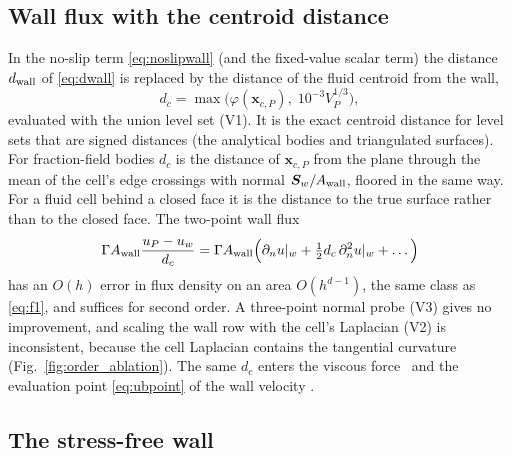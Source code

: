 \documentclass[11pt,a4paper]{article}
\theoremstyle{remark}
\newcommand{\xx}{\bm{x}}
\newcommand{\Aw}{A_{\rm wall}}
\newcommand{\dw}{d_{\rm wall}}
\begin{document}
\subsection{Wall flux with the centroid distance}

In the no-slip term \eqref{eq:noslipwall} (and the fixed-value scalar term) the distance
$\dw$ of \eqref{eq:dwall} is replaced by the distance of the fluid centroid from the wall,
\begin{equation}
d_c=\max\big(\varphi(\xx_{c,P}),\;10^{-3}V_P^{1/3}\big),
\label{eq:dc}
\end{equation}
evaluated with the union level set (V1). It is the exact centroid distance for level sets that
are signed distances (the analytical bodies and triangulated surfaces). For fraction-field
bodies $d_c$ is the distance of $\xx_{c,P}$ from the plane through the mean of the cell's edge
crossings with normal $\bm S_w/\Aw$, floored in the same way. For a fluid cell behind a closed face it is the distance to the true
surface rather than to the closed face. The two-point wall flux
\begin{equation}
\Gamma\Aw\frac{u_P-u_w}{d_c}=\Gamma\Aw\Big(\partial_nu|_w+\tfrac12d_c\,\partial^2_nu|_w+\dots\Big)
\end{equation}
has an $O(h)$ error in flux density on an area $O(h^{d-1})$, the same class as \eqref{eq:f1},
and suffices for second order. A three-point normal probe (V3) gives no improvement, and
scaling the wall row with the cell's Laplacian (V2) is inconsistent, because the cell
Laplacian contains the tangential curvature (Fig.~\ref{fig:order_ablation}). The same $d_c$
enters the viscous force%
\ and the evaluation point \eqref{eq:ubpoint} of the wall velocity%
.

\subsection{The stress-free wall}
\label{sec:zeroshear}
\end{document}
